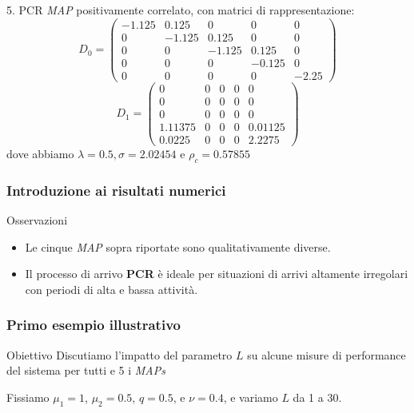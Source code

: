 \documentclass{beamer}
\begin{document}
\begin{frame}
    \frametitle{}
    \begin{block}{5. PCR}
        \emph{MAP} positivamente correlato, con matrici di rappresentazione:
        \small{\begin{equation*}
            D_0 =
            \begin{pmatrix}
                -1.125 & 0.125 & 0 & 0 & 0 \\
                0 & -1.125 & 0.125 & 0 & 0 \\
                0 & 0 & -1.125 & 0.125 & 0 \\
                0 & 0 & 0 & -0.125 & 0 \\
                0 & 0 & 0 & 0 & -2.25
            \end{pmatrix}
        \end{equation*}
        \begin{equation*}
            D_1 =
            \begin{pmatrix}
                0 & 0 & 0 & 0 & 0 \\
                0 & 0 & 0 & 0 & 0 \\
                0 & 0 & 0 & 0 & 0 \\
                1.11375 & 0 & 0 & 0 & 0.01125 \\
                0.0225 & 0 & 0 & 0 & 2.2275
            \end{pmatrix}
        \end{equation*}}
        dove abbiamo $\lambda = 0.5, \sigma = 2.02454$ e $\rho_c =  0.57855$
    \end{block}
\end{frame}


\begin{frame}
    \frametitle{Introduzione ai risultati numerici}
    \begin{block}{Osservazioni}
        \begin{itemize}
            \item Le cinque \emph{MAP} sopra riportate sono qualitativamente diverse.
            \item Il processo di arrivo \textbf{PCR} è ideale per situazioni di arrivi altamente irregolari con periodi di alta e bassa attività.
        \end{itemize}
    \end{block}
\end{frame}


\begin{frame}
    \frametitle{Primo esempio illustrativo}
    \begin{block}{Obiettivo}
        Discutiamo l'impatto del parametro $L$ su alcune misure di performance del sistema per tutti e 5 i \emph{MAPs}
    \end{block}
    Fissiamo $\mu_1=1$, $\mu_2=0.5$, $q=0.5$, e $\nu=0.4$, e variamo $L$ da 1 a 30.
\end{frame}
\end{document}
